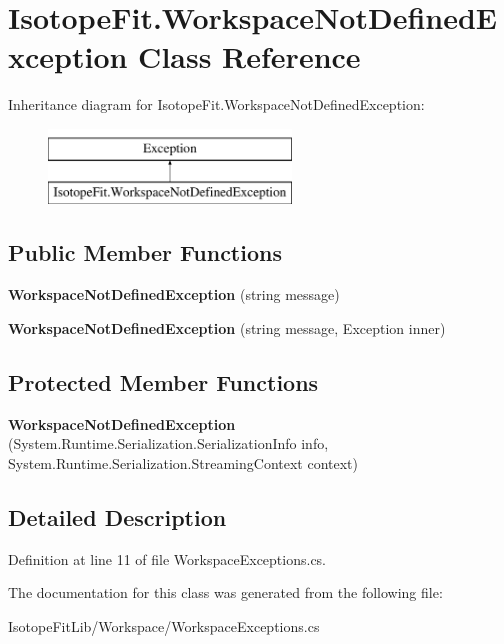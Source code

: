 \hypertarget{class_isotope_fit_1_1_workspace_not_defined_exception}{}\section{Isotope\+Fit.\+Workspace\+Not\+Defined\+Exception Class Reference}
\label{class_isotope_fit_1_1_workspace_not_defined_exception}
Inheritance diagram for Isotope\+Fit.\+Workspace\+Not\+Defined\+Exception\+:\begin{figure}[H]
\begin{center}
\leavevmode
\includegraphics[height=2.000000cm]{class_isotope_fit_1_1_workspace_not_defined_exception}
\end{center}
\end{figure}
\subsection*{Public Member Functions}
\begin{DoxyCompactItemize}
\item 
\mbox{\label{class_isotope_fit_1_1_workspace_not_defined_exception_a3b995d53506b67b380bc2c54754321dc}} 
{\bfseries Workspace\+Not\+Defined\+Exception} (string message)
\item 
\mbox{\label{class_isotope_fit_1_1_workspace_not_defined_exception_a53f2fd5a9c57a46f898b632963a2c406}} 
{\bfseries Workspace\+Not\+Defined\+Exception} (string message, Exception inner)
\end{DoxyCompactItemize}
\subsection*{Protected Member Functions}
\begin{DoxyCompactItemize}
\item 
\mbox{\label{class_isotope_fit_1_1_workspace_not_defined_exception_aff29f81b2cf445dd91deb0f2e58c83e3}} 
{\bfseries Workspace\+Not\+Defined\+Exception} (System.\+Runtime.\+Serialization.\+Serialization\+Info info, System.\+Runtime.\+Serialization.\+Streaming\+Context context)
\end{DoxyCompactItemize}


\subsection{Detailed Description}


Definition at line 11 of file Workspace\+Exceptions.\+cs.



The documentation for this class was generated from the following file\+:\begin{DoxyCompactItemize}
\item 
Isotope\+Fit\+Lib/\+Workspace/Workspace\+Exceptions.\+cs\end{DoxyCompactItemize}
